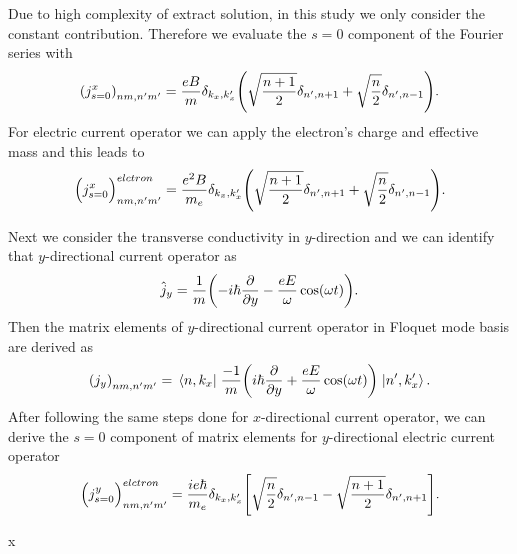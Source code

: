 Due to high complexity of extract solution, in this study we only consider the constant contribution. Therefore we evaluate the $s=0$ component of the Fourier series with
\begin{equation} \label{eq_d10}
    \qty({j}^x_{s=0})_{nm,n'm'} =
    \frac{eB}{{m}}
    \delta_{k_x,k'_x}
    \qty(\sqrt{\frac{n+1}{2}} \delta_{n',n+1} + \sqrt{\frac{n}{2}}
    \delta_{n',n-1}).
\end{equation}
For electric current operator we can apply the electron's charge and effective mass and this leads to
\begin{equation} \label{eq_d11}
    \Big({j}^x_{s=0}\Big)_{nm,n'm'}^{elctron} =
    \frac{e^2B}{{m_e}}
    \delta_{k_x,k'_x}
    \qty(\sqrt{\frac{n+1}{2}} \delta_{n',n+1} + \sqrt{\frac{n}{2}}
    \delta_{n',n-1}).
\end{equation}

Next we consider the transverse conductivity in $y$-direction and we can identify that $y$-directional current operator as
\begin{equation} \label{eq_d12}
  \hat{j}_y = \frac{1}{m} \qty(-i\hbar\pdv{y} - \frac{eE}{\omega}\cos(\omega t)).
\end{equation}
Then the matrix elements of $y$-directional current operator in Floquet mode basis are derived as
\begin{equation} \label{eq_d13}
  \qty({j}_y)_{nm,n'm'} =
  \mel{n,k_x}{\;\frac{-1}{m} \qty(i\hbar\pdv{y} + \frac{eE}{\omega}\cos(\omega t))\;}{n',k'_x}.
\end{equation}
After following the same steps done for $x$-directional current operator, we can derive the $s=0$ component of matrix elements for $y$-directional electric current operator
\begin{equation} \label{eq_d14}
    \Big({j}^y_{s=0}\Big)_{nm,n'm'}^{elctron} =
    \frac{ie\hbar}{{m_e}}
    \delta_{k_x,k'_x}
    \qty[
    \sqrt{\frac{n}{2}} \delta_{n',n-1}
    - \sqrt{\frac{n+1}{2}} \delta_{n',n+1}
    ].
\end{equation}









x
